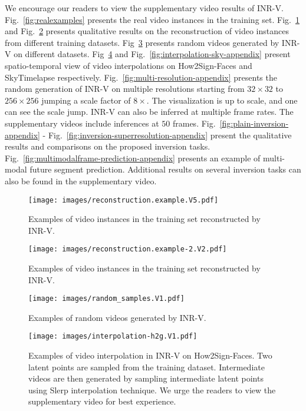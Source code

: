 \documentclass[10pt]{article} \usepackage[accepted]{tmlr}
\begin{document}
We encourage our readers to view the supplementary video results of INR-V. Fig.~\ref{fig:realexamples} presents the real video instances in the training set. Fig.~\ref{fig:rec-1-appendix} and Fig.~\ref{fig:rec-2-appendix} presents qualitative results on the reconstruction of video instances from different training datasets. Fig~\ref{fig:random-samples-appendix} presents random videos generated by INR-V on different datasets. Fig~\ref{fig:interpolation-h2g-appendix} and Fig.~\ref{fig:interpolation-sky-appendix} present spatio-temporal view of video interpolations on How2Sign-Faces and SkyTimelapse respectively. Fig.~\ref{fig:multi-resolution-appendix} presents the random generation of INR-V on multiple resolutions starting from $32\times32$ to $256\times256$ jumping a scale factor of $8\times$. The visualization is up to scale, and one can see the scale jump. INR-V can also be inferred at multiple frame rates. The supplementary videos include inferences at $50$ frames. Fig.~\ref{fig:plain-inversion-appendix} - Fig.~\ref{fig:inversion-superresolution-appendix} present the qualitative results and comparisons on the proposed inversion tasks. Fig.~\ref{fig:multimodalframe-prediction-appendix} presents an example of multi-modal future segment prediction. Additional results on several inversion tasks can also be found in the supplementary video.

\begin{figure}[t]
  \centering
  \texttt{[image: images/reconstruction.example.V5.pdf]}
  \caption{Examples of video instances in the training set reconstructed by INR-V.}
  \label{fig:rec-1-appendix}
\end{figure}

\begin{figure}[t]
  \centering
  \texttt{[image: images/reconstruction.example-2.V2.pdf]}
  \caption{Examples of video instances in the training set reconstructed by INR-V.}
  \label{fig:rec-2-appendix}
\end{figure}

\begin{figure}[t]
  \centering
  \texttt{[image: images/random\_samples.V1.pdf]}
  \caption{Examples of random videos generated by INR-V.}
  \label{fig:random-samples-appendix}
\end{figure}

\begin{figure}[t]
  \centering
  \texttt{[image: images/interpolation-h2g.V1.pdf]}
  \caption{Examples of video interpolation in INR-V on How2Sign-Faces. Two latent points are sampled from the training dataset. Intermediate videos are then generated by sampling intermediate latent points using Slerp interpolation technique. We urge the readers to view the supplementary video for best experience. }
  \label{fig:interpolation-h2g-appendix}
\end{figure}
\end{document}
